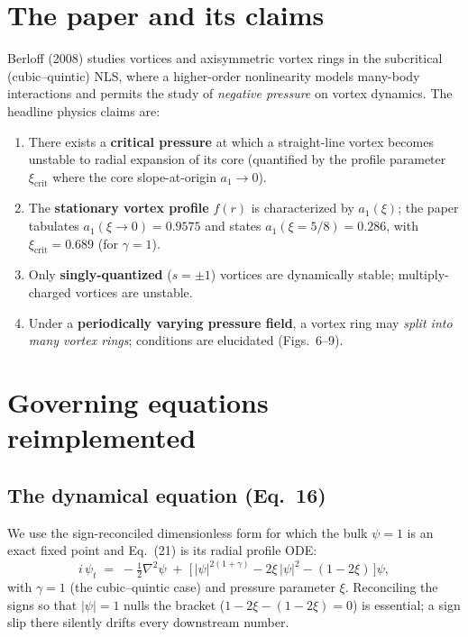 \documentclass[11pt]{article}
\begin{document}
\section{The paper and its claims}
Berloff (2008) studies vortices and axisymmetric vortex rings in the subcritical
(cubic--quintic) NLS, where a higher-order nonlinearity models many-body
interactions and permits the study of \emph{negative pressure} on vortex
dynamics. The headline physics claims are:
\begin{enumerate}
  \item There exists a \textbf{critical pressure} at which a straight-line vortex
        becomes unstable to radial expansion of its core (quantified by the
        profile parameter $\xi_{\mathrm{crit}}$ where the core slope-at-origin
        $a_1\to0$).
  \item The \textbf{stationary vortex profile} $f(r)$ is characterized by
        $a_1(\xi)$; the paper tabulates $a_1(\xi\!\to\!0)=0.9575$ and states
        $a_1(\xi=5/8)=0.286$, with $\xi_{\mathrm{crit}}=0.689$ (for
        $\gamma=1$).
  \item Only \textbf{singly-quantized} ($s=\pm1$) vortices are dynamically
        stable; multiply-charged vortices are unstable.
  \item Under a \textbf{periodically varying pressure field}, a vortex ring may
        \emph{split into many vortex rings}; conditions are elucidated
        (Figs.~6--9).
\end{enumerate}

\section{Governing equations reimplemented}
\subsection{The dynamical equation (Eq.~16)}
We use the sign-reconciled dimensionless form for which the bulk $\psi=1$ is an
exact fixed point and Eq.~(21) is its radial profile ODE:
\begin{equation}
  i\,\psi_t \;=\; -\tfrac{1}{2}\nabla^2\psi
    \;+\; \Big[\,|\psi|^{2(1+\gamma)} - 2\xi\,|\psi|^2 - (1-2\xi)\,\Big]\psi,
  \label{eq:gpe}
\end{equation}
with $\gamma=1$ (the cubic--quintic case) and pressure parameter $\xi$.
Reconciling the signs so that $|\psi|=1$ nulls the bracket
($1 - 2\xi - (1-2\xi)=0$) is essential; a sign slip there silently drifts every
downstream number.
\end{document}
